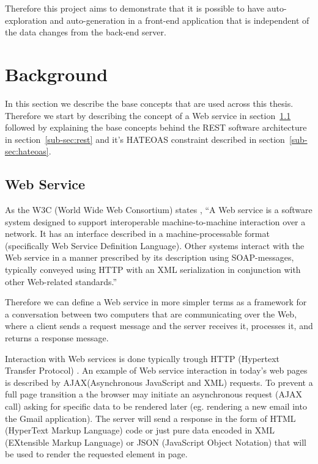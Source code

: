 Therefore this project aims to demonstrate that it is possible to have auto-exploration and auto-generation in a front-end application that is independent of the data changes from the back-end server.


\section{Background}
\label{sec:background}

In this section we describe the base concepts that are used across this thesis. Therefore we start by describing the concept of a Web service in section~\ref{sub-sec:web-service} followed by explaining the base concepts behind the REST software architecture in section~\ref{sub-sec:rest} and it's HATEOAS constraint described in section~\ref{sub-sec:hateoas}.

\subsection{Web Service}
\label{sub-sec:web-service}

As the W3C (World Wide Web Consortium) states \cite{W3C}, ``A Web service is a software system designed to support interoperable machine-to-machine interaction over a network. It has an interface described in a machine-processable format (specifically Web Service Definition Language). Other systems interact with the Web service in a manner prescribed by its description using SOAP-messages, typically conveyed using HTTP with an XML serialization in conjunction with other Web-related standards.'' 

Therefore we can define a Web service in more simpler terms as a framework for a conversation between two computers that are communicating over the Web, where a client sends a request message and the server receives it, processes it, and returns a response message.

Interaction with Web services is done typically trough HTTP (Hypertext Transfer Protocol) \cite{book4}. An example of Web service interaction in today's web pages is described by AJAX(Asynchronous JavaScript and XML) requests.   To prevent a full page transition a the browser may initiate an asynchronous request (AJAX call) asking for specific data to be rendered later (eg. rendering a new email into the Gmail application). The server will send a response in the form of HTML (HyperText Markup Language) code or just pure data encoded in XML (EXtensible Markup Language) or JSON (JavaScript Object Notation) that will be used to render the requested element in page.

